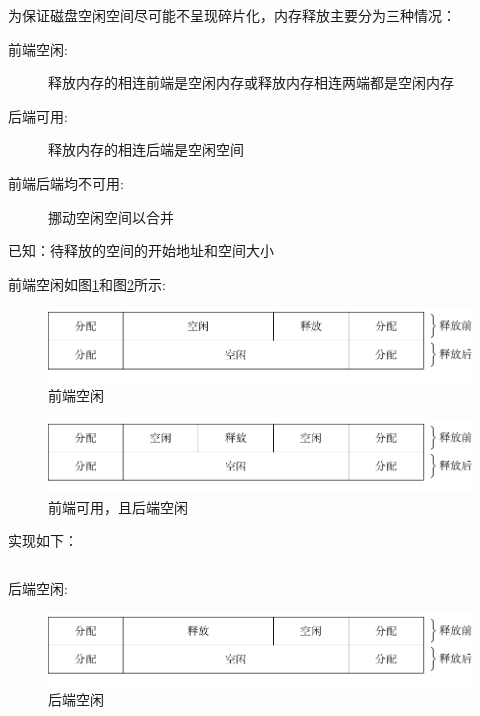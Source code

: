 \documentclass{swfcthesis}
\begin{document}
		为保证磁盘空闲空间尽可能不呈现碎片化，内存释放主要分为三种情况：

		\begin{description}
			\item[前端空闲:]释放内存的相连前端是空闲内存或释放内存相连两端都是空闲内存
			\item[后端可用:]释放内存的相连后端是空闲空间
			\item[前端后端均不可用:]挪动空闲空间以合并
		\end{description}

		已知：待释放的空间的开始地址和空间大小
		
		\newpage

		前端空闲如图\ref{fig:mem0}和图\ref{fig:mem1}所示: 

		\begin{figure}[h]
			\centering
			\includegraphics[width=.7\textwidth]{fig/mem0.pdf}
			\caption{前端空闲}
			\label{fig:mem0}
		\end{figure}

		\begin{figure}[h]
			\centering
			\includegraphics[width=.7\textwidth]{fig/mem1.pdf}
			\caption{前端可用，且后端空闲}
			\label{fig:mem1}
		\end{figure}

		实现如下：

		\begin{listing}[H]
		\inputminted[tabsize=2, firstline=98, lastline=116,
		linenos=true]{c}{../ZOS/src/kernel/memory.c}
		\end{listing}

		后端空闲:

		\begin{figure}[h]
			\centering
			\includegraphics[width=.7\textwidth]{fig/mem2.pdf}
			\caption{后端空闲}
			\label{fig:mem3}
		\end{figure}
\end{document}

